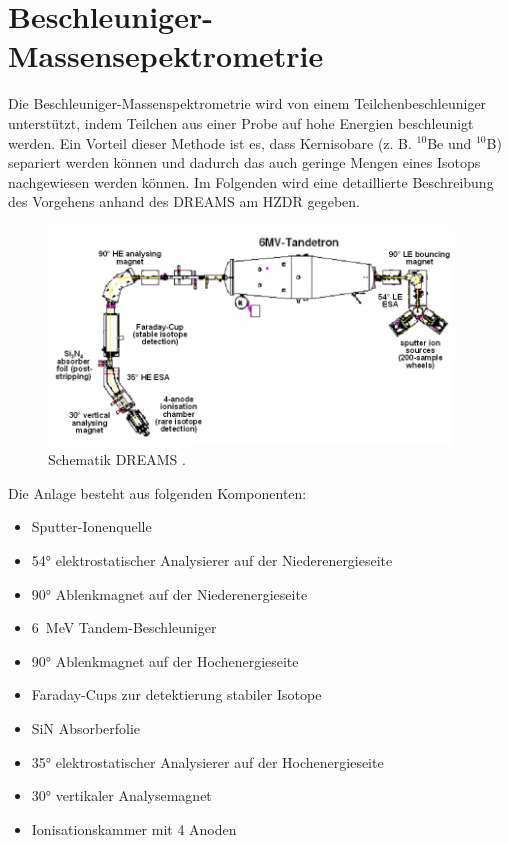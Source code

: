 \section{Beschleuniger-Massensepektrometrie}

Die Beschleuniger-Massenspektrometrie wird von einem Teilchenbeschleuniger unterstützt, indem Teilchen aus einer Probe auf hohe Energien beschleunigt werden.
Ein Vorteil dieser Methode ist es, dass Kernisobare (z. B. $^{10}$Be und $^{10}$B) separiert werden können und dadurch das auch geringe Mengen eines Isotops nachgewiesen werden können.
Im Folgenden wird eine detaillierte Beschreibung des Vorgehens anhand des DREAMS am HZDR gegeben.
\begin{figure}[ht]
	\centering
    \includegraphics[width=0.95\textwidth]{Pictures/DREAMS.png}
	\caption{Schematik DREAMS \cite{Bild_DREAMS}.}
	\label{Theorie_Bild_DREAMS}
\end{figure}
Die Anlage besteht aus folgenden Komponenten:
\begin{itemize}
    \item Sputter-Ionenquelle
    \item \ang{54} elektrostatischer Analysierer auf der Niederenergieseite
    \item \ang{90} Ablenkmagnet auf der Niederenergieseite
    \item \SI{6}{\mega\electronvolt} Tandem-Beschleuniger
    \item \ang{90} Ablenkmagnet auf der Hochenergieseite
    \item Faraday-Cups zur detektierung stabiler Isotope
    \item SiN Absorberfolie
    \item \ang{35} elektrostatischer Analysierer auf der Hochenergieseite
    \item \ang{30} vertikaler Analysemagnet
    \item Ionisationskammer mit 4 Anoden
\end{itemize}
